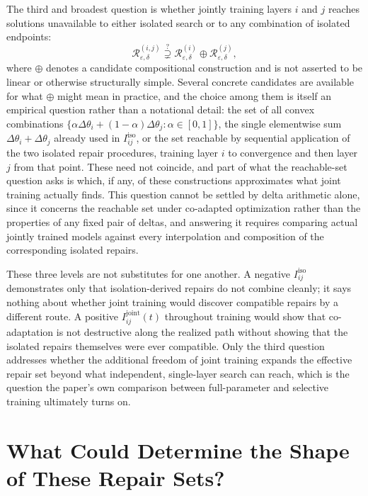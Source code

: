 \documentclass[11pt]{article}
\begin{document}
The third and broadest question is whether jointly training layers $i$ and $j$ reaches solutions unavailable to either isolated search or to any combination of isolated endpoints:
\[
\mathcal{R}^{(i,j)}_{\varepsilon,\delta} \overset{?}{\supsetneq} \mathcal{R}^{(i)}_{\varepsilon,\delta} \oplus \mathcal{R}^{(j)}_{\varepsilon,\delta},
\]
where $\oplus$ denotes a candidate compositional construction and is not asserted to be linear or otherwise structurally simple. Several concrete candidates are available for what $\oplus$ might mean in practice, and the choice among them is itself an empirical question rather than a notational detail: the set of all convex combinations $\{\alpha \Delta\theta_i + (1-\alpha)\Delta\theta_j : \alpha \in [0,1]\}$, the single elementwise sum $\Delta\theta_i + \Delta\theta_j$ already used in $I_{ij}^{\mathrm{iso}}$, or the set reachable by sequential application of the two isolated repair procedures, training layer $i$ to convergence and then layer $j$ from that point. These need not coincide, and part of what the reachable-set question asks is which, if any, of these constructions approximates what joint training actually finds. This question cannot be settled by delta arithmetic alone, since it concerns the reachable set under co-adapted optimization rather than the properties of any fixed pair of deltas, and answering it requires comparing actual jointly trained models against every interpolation and composition of the corresponding isolated repairs.

These three levels are not substitutes for one another. A negative $I_{ij}^{\mathrm{iso}}$ demonstrates only that isolation-derived repairs do not combine cleanly; it says nothing about whether joint training would discover compatible repairs by a different route. A positive $I_{ij}^{\mathrm{joint}}(t)$ throughout training would show that co-adaptation is not destructive along the realized path without showing that the isolated repairs themselves were ever compatible. Only the third question addresses whether the additional freedom of joint training expands the effective repair set beyond what independent, single-layer search can reach, which is the question the paper's own comparison between full-parameter and selective training ultimately turns on.

\section{What Could Determine the Shape of These Repair Sets?}
\end{document}
